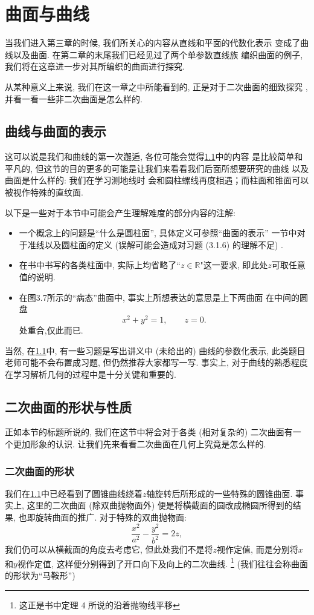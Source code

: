 \documentclass[./main.tex]{subfiles}
\begin{document}
\chapter{曲面与曲线}
    当我们进入第三章的时候, 我们所关心的内容从直线和平面的代数化表示
    变成了曲线以及曲面. 在第二章的末尾我们已经见过了两个单参数直线族
    编织曲面的例子, 我们将在这章进一步对其所编织的曲面进行探究. \par
    从某种意义上来说, 我们在这一章之中所能看到的, 正是对于二次曲面的细致探究
    , 并看一看一些非二次曲面是怎么样的. 
\section{曲线与曲面的表示}\label{3.1}

这可以说是我们和曲线的第一次邂逅, 各位可能会觉得\ref{3.1}中的内容
是比较简单和平凡的, 但这节的目的更多的可能是让我们来看看我们后面所想要研究的曲线
以及曲面是什么样的: 我们在学习测地线时
会和圆柱螺线再度相遇；而柱面和锥面可以被视作特殊的直纹面.

以下是一些对于本节中可能会产生理解难度的部分内容的注解: 
\begin{itemize}
    \item 一个概念上的问题是``什么是圆柱面'', 具体定义可参照``曲面的表示''
    一节中对于准线以及圆柱面的定义 (误解可能会造成对习题 (3.1.6) 的理解不足) . 
    \item 在书中书写的各类柱面中, 实际上均省略了``$z\in\mathbb{R}$"这一要求, 
    即此处$z$可取任意值的说明. 
    \item 在图3.7所示的``病态''曲面中, 事实上所想表达的意思是上下两曲面
        在中间的圆盘
        \[
            x^2+y^2=1,\qquad z=0.
        \]
        处重合,仅此而已. 
\end{itemize}

当然, 在\ref{3.1}中, 有一些习题是写出讲义中 (未给出的) 曲线的参数化表示, 此类题目老师可能不会布置成习题, 但仍然推荐大家都写一写. 事实上, 对于曲线的熟悉程度
在学习解析几何的过程中是十分关键和重要的. 
\section{二次曲面的形状与性质}\label{3.2}
正如本节的标题所说的, 我们在这节中将会对于各类 (相对复杂的) 二次曲面有一个更加形象的认识. 让我们先来看看二次曲面在几何上究竟是怎么样的. 
\subsection{二次曲面的形状}
我们在\ref{3.1}中已经看到了圆锥曲线绕着$z$轴旋转后所形成的一些特殊的圆锥曲面. 事实上, 这里的二次曲面 (除双曲抛物面外) 便是将横截面的圆改成椭圆所得到的结果, 也即旋转曲面的推广. 对于特殊的双曲抛物面: 
\[
\frac{x^2}{a^2}-\frac{y^2}{b^2}=2z,
\]
我们仍可以从横截面的角度去考虑它, 但此处我们不是将$z$视作定值, 而是分别将$x$和$y$视作定值, 这样便分别得到了开口向下及向上的二次曲线. \footnote{这正是书中定理 4 所说的沿着抛物线平移}
 (我们往往会称曲面的形状为``马鞍形'') 
\end{document}
